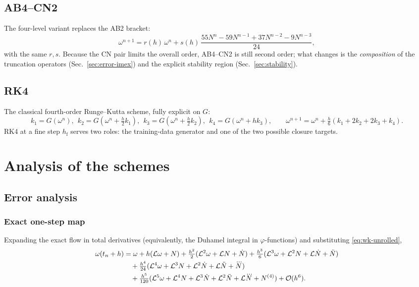 \documentclass[11pt]{article}
\theoremstyle{plain}
\theoremstyle{definition}
\newcommand{\Lop}{\mathcal{L}}
\newcommand{\Ndot}{\dot{N}}
\newcommand{\Nddot}{\ddot{N}}
\newcommand{\Ndddot}{\dddot{N}}
\newcommand{\bO}{\mathcal{O}}
\newcommand{\hf}{h_{\mathrm{f}}}
\begin{document}
\subsection{AB4--CN2}
\label{sec:ab4cn2}
The four-level variant replaces the AB2 bracket:
\begin{equation}
\omega^{n+1}=r(h)\,\omega^n+s(h)\,
\frac{55N^n-59N^{n-1}+37N^{n-2}-9N^{n-3}}{24},
\label{eq:ab4cn2}
\end{equation}
with the same $r,s$. Because the CN pair limits the overall order, AB4--CN2 is
still second order; what changes is the \emph{composition} of the truncation
operators (Sec.~\ref{sec:error-imex}) and the explicit stability region
(Sec.~\ref{sec:stability}).

\subsection{RK4}
\label{sec:rk4}
The classical fourth-order Runge--Kutta scheme, fully explicit on $G$:
\begin{equation}
k_1=G(\omega^n),\ \
k_2=G(\omega^n+\tfrac h2k_1),\ \
k_3=G(\omega^n+\tfrac h2k_2),\ \
k_4=G(\omega^n+hk_3),\qquad
\omega^{n+1}=\omega^n+\tfrac h6(k_1+2k_2+2k_3+k_4).
\label{eq:rk4}
\end{equation}
RK4 at a fine step $\hf$ serves two roles: the training-data generator and
one of the two possible closure targets.

\section{Analysis of the schemes}
\label{sec:scheme-analysis}

\subsection{Error analysis}
\label{sec:error}

\subsubsection{Exact one-step map}
Expanding the exact flow in total derivatives (equivalently, the Duhamel
integral in $\varphi$-functions) and substituting \eqref{eq:wk-unrolled},
\begin{align}
\omega(t_n+h)
&= \omega + h(\Lop\omega+N)
 +\tfrac{h^2}{2}(\Lop^2\omega+\Lop N+\Ndot)
 +\tfrac{h^3}{6}(\Lop^3\omega+\Lop^2N+\Lop\Ndot+\Nddot)\notag\\
&\quad+\tfrac{h^4}{24}(\Lop^4\omega+\Lop^3N+\Lop^2\Ndot+\Lop\Nddot+\Ndddot)
\notag\\
&\quad+\tfrac{h^5}{120}(\Lop^5\omega+\Lop^4N+\Lop^3\Ndot+\Lop^2\Nddot
 +\Lop\Ndddot+N^{(4)})+\bO(h^6).
\label{eq:exact-expanded}
\end{align}
\end{document}
